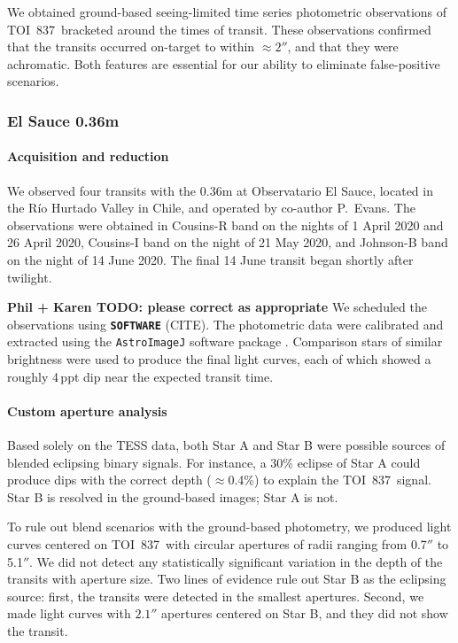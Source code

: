 \documentclass[12pt,twocolumn,tighten]{aastex63}
\newcommand{\tn}{TOI~837} %
\begin{document}
We obtained ground-based seeing-limited time series photometric
observations of \tn\ bracketed around the times of transit.  These
observations confirmed that the transits occurred on-target to within
$\approx 2''$, and that they were achromatic. Both features are
essential for our ability to eliminate false-positive scenarios.

\subsubsection{El Sauce 0.36m}

\paragraph{Acquisition and reduction}
We observed four transits with the 0.36m at Observatario El Sauce,
located in the R\'io Hurtado Valley in Chile, and operated by
co-author P{.}~Evans.  The observations were obtained in Cousins-R
band on the nights of 1 April 2020 and 26 April 2020, Cousins-I band
on the night of 21 May 2020, and Johnson-B band on the night of 14
June 2020.  The final 14 June transit began shortly after twilight.

{\bf Phil + Karen TODO: please correct as appropriate}
We scheduled the observations using {\bf \texttt{SOFTWARE}} (CITE).
The photometric data were calibrated and extracted using the
\texttt{AstroImageJ} software package
\citep{collins_astroimagej_2017}.  Comparison stars of similar
brightness were used to produce the final light curves, each of which
showed a roughly 4$\,$ppt dip near the expected transit time.


\paragraph{Custom aperture analysis}
Based solely on the TESS data, both Star A and Star B
were possible sources of blended eclipsing binary signals.
For instance, a 30\% eclipse of Star A could produce
dips with the correct depth ($\approx$0.4\%) to explain the \tn\ signal.
Star B is resolved in the ground-based images; Star A is not.

To rule out blend scenarios with the ground-based photometry, we
produced light curves centered on \tn\ with
circular apertures of radii ranging from 0.7$''$ to 5.1$''$.
We did not detect any statistically significant variation in the depth
of the transits with aperture size.
Two lines of evidence rule out Star B as the eclipsing source:
first, the transits
were detected in the smallest apertures.
Second, we made light curves with $2.1''$ apertures centered on Star B,
and they did not show the transit.
\end{document}

